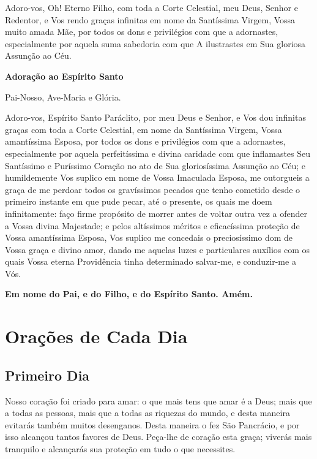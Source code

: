 \documentclass[18pt]{article}
\begin{document}
Adoro-vos, Oh! Eterno Filho, com toda a Corte Celestial, meu Deus, Senhor e Redentor, e Vos rendo graças infinitas em nome da Santíssima Virgem, Vossa muito amada Mãe, por todos os dons e privilégios com que a adornastes, especialmente por aquela suma sabedoria com que A ilustrastes em Sua gloriosa Assunção ao Céu.

\textbf{Adoração ao Espírito Santo}

Pai-Nosso, Ave-Maria e Glória.

Adoro-vos, Espírito Santo Paráclito, por meu Deus e Senhor, e Vos dou infinitas graças com toda a Corte Celestial, em nome da Santíssima Virgem, Vossa amantíssima Esposa, por todos os dons e privilégios com que a adornastes, especialmente por aquela perfeitíssima e divina caridade com que inflamastes Seu Santíssimo e Puríssimo Coração no ato de Sua gloriosíssima Assunção ao Céu; e humildemente Vos suplico em nome de Vossa Imaculada Esposa, me outorgueis a graça de me perdoar todos os gravíssimos pecados que tenho cometido desde o primeiro instante em que pude pecar, até o presente, os quais me doem infinitamente: faço firme propósito de morrer antes de voltar outra vez a ofender a Vossa divina Majestade; e pelos altíssimos méritos e eficacíssima proteção de Vossa amantíssima Esposa, Vos suplico me concedais o preciosíssimo dom de Vossa graça e divino amor, dando me aquelas luzes e particulares auxílios com os quais Vossa eterna Providência tinha determinado salvar-me, e conduzir-me a Vós.

\textbf{Em nome do Pai, e do Filho, e do Espírito Santo. Amém.}

\vfill


\newpage

\section*{Orações de Cada Dia}

\subsection*{Primeiro Dia}
Nosso coração foi criado para amar: o que mais tens que amar é a Deus; mais que a todas as pessoas, mais que a todas as riquezas do mundo, e desta maneira evitarás também muitos desenganos. Desta maneira o fez São Pancrácio, e por isso alcançou tantos favores de Deus. Peça-lhe de coração esta graça; viverás mais tranquilo e alcançarás sua proteção em tudo o que necessites.
\end{document}
